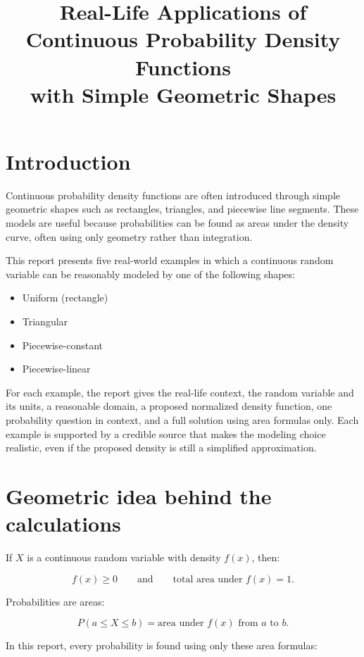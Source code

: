 \documentclass[11pt]{article}
\title{Real-Life Applications of Continuous Probability Density Functions\\with Simple Geometric Shapes}
\author{}
\date{}
\begin{document}
	
	\maketitle
	
	\section{Introduction}
	
	Continuous probability density functions are often introduced through simple geometric shapes such as rectangles, triangles, and piecewise line segments. These models are useful because probabilities can be found as areas under the density curve, often using only geometry rather than integration.
	
	This report presents five real-world examples in which a continuous random variable can be reasonably modeled by one of the following shapes:
	
	\begin{itemize}[leftmargin=*]
		\item Uniform (rectangle)
		\item Triangular
		\item Piecewise-constant
		\item Piecewise-linear
	\end{itemize}
	
	For each example, the report gives the real-life context, the random variable and its units, a reasonable domain, a proposed normalized density function, one probability question in context, and a full solution using area formulas only. Each example is supported by a credible source that makes the modeling choice realistic, even if the proposed density is still a simplified approximation.
	
	\section{Geometric idea behind the calculations}
	
	If $X$ is a continuous random variable with density $f(x)$, then:
	
	\[
	f(x)\ge 0
	\qquad\text{and}\qquad
	\text{total area under }f(x)=1.
	\]
	
	Probabilities are areas:
	
	\[
	P(a\le X\le b)=\text{area under }f(x)\text{ from }a\text{ to }b.
	\]
	
	In this report, every probability is found using only these area formulas:
	
\end{document}
